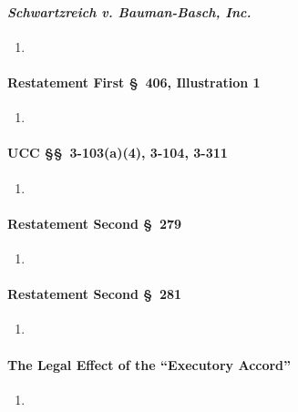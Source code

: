 \paragraph{\emph{Schwartzreich v. Bauman-Basch, Inc.}}

\begin{enumerate}
    \item %
\end{enumerate}

\paragraph{Restatement First \S\ 406, Illustration 1}

\begin{enumerate}
    \item %
\end{enumerate}

\paragraph{UCC \S\S\ 3-103(a)(4), 3-104, 3-311}

\begin{enumerate}
    \item %
\end{enumerate}

\paragraph{Restatement Second \S\ 279}

\begin{enumerate}
    \item %
\end{enumerate}

\paragraph{Restatement Second \S\ 281}

\begin{enumerate}
    \item %
\end{enumerate}

\paragraph{The Legal Effect of the ``Executory Accord''}

\begin{enumerate}
    \item %
\end{enumerate}

